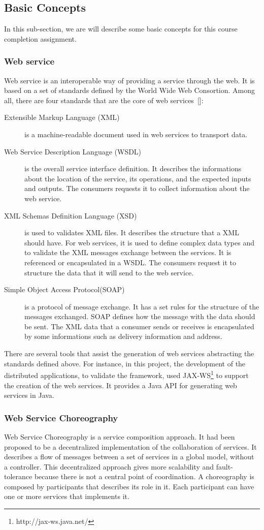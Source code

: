 \subsection{Basic Concepts}
In this sub-section, we are will describe some basic concepts for this course completion assignment.

\subsubsection{Web service}
Web service is an interoperable way of providing a service through the web. It is based on a set of standards defined by the World Wide Web Consortion. Among all, there are four standards that are the core of web services~[\citet{Bean10}]:
\begin{description}
\item[Extensible Markup Language (XML)] is a machine-readable document used in web services to transport data.
\item[Web Service Description Language (WSDL)] is the overall service interface definition. It describes the informations about the location of the service, its operations, and the expected inputs and outputs. The consumers requests it to collect information about the web service.
\item[XML Schemas Definition Language (XSD)] is used to validates XML files. It describes the structure that a XML should have. For web services, it is used to define complex data types and to validate the XML messages exchange between the services. It is referenced or encapsulated in a WSDL. The consumers request it to structure the data that it will send to the web service.
\item[Simple Object Access Protocol(SOAP)] is a protocol of message exchange. It has a set rules for the structure of the messages exchanged. SOAP defines how the message with the data should be sent. The XML data that a consumer sends or receives is encapsulated by some informations such as delivery information and address.
\end{description}

There are several tools that assist the generation of web services abstracting the standards defined above. For instance, in this project, the development of the distributed applications, to validate the framework, used JAX-WS\footnote{http://jax-ws.java.net/} to support the creation of the web services. It provides a Java API for generating web services in Java.

\subsubsection{Web Service Choreography}
Web Service Choreography is a service composition approach. It had been proposed to be a decentralized implementation of the collaboration of services.  It describes a flow of messages between a set of services in a global model, without a controller. This decentralized approach gives more scalability and fault-tolerance because there is not a central point of coordination.  A choreography is composed by participants that describes its role in it. Each participant can have one or more services that implements it.

